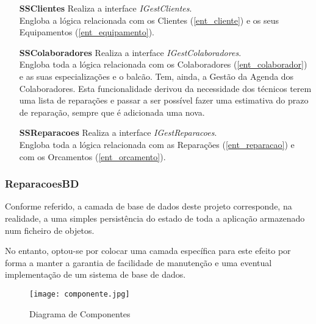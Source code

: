 \documentclass[../relatorio.tex]{subfiles}
\begin{document}
\begin{itemize}
    \item[\textbf{SSClientes}] {
          Realiza a interface \textit{IGestClientes}.\\
          Engloba a lógica relacionada com os Clientes (\ref{ent_cliente})
          e os seus Equipamentos (\ref{ent_equipamento}).
          }
    \item[\textbf{SSColaboradores}] {
          Realiza a interface \textit{IGestColaboradores}.\\
          Engloba toda a lógica relacionada com os Colaboradores (\ref{ent_colaborador})
          e as suas especializações e o balcão.
          Tem, ainda, a Gestão da Agenda dos Colaboradores.
          Esta funcionalidade derivou da necessidade dos técnicos terem uma lista de reparações
          e passar a ser possível fazer uma estimativa do prazo de reparação, sempre que é adicionada
          uma nova.
          }
    \item[\textbf{SSReparacoes}] {
          Realiza a interface \textit{IGestReparacoes}.\\
          Engloba toda a lógica relacionada com as Reparações (\ref{ent_reparacao})
          e com os Orcamentos (\ref{ent_orcamento}).
          }
\end{itemize}

\subsubsection*{ReparacoesBD} \label{sec:reparacoes_bd}
Conforme referido, a camada de base de dados deste projeto corresponde,
na realidade, a uma simples persistência do estado de toda a aplicação
armazenado num ficheiro de objetos.

No entanto, optou-se por colocar uma camada específica para este efeito
por forma a manter a garantia de facilidade de manutenção e uma eventual
implementação de um sistema de base de dados.

\begin{figure}[!ht]
    \texttt{[image: componente.jpg]}
    \caption{Diagrama de Componentes} \label{img:diagrama_componentes}
\end{figure}
\end{document}
